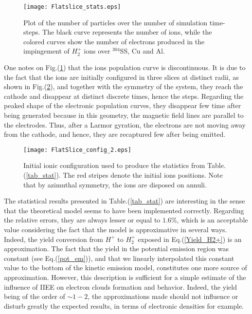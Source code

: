 \begin{figure}[h!]
\centering
	\texttt{[image: Flatslice\_stats.eps]}
	\caption{\label{flat_slice} Plot of the number of particles over the number of simulation time-steps. The black curve represents the number of ions, while the colored curves show the number of electrons produced in the impingement of $H_2^+$ ions over $^{304}$SS, Cu and Al.}
\end{figure}  

\noindent One notes on Fig.(\ref{flat_slice}) that the ions population curve is discontinuous. It is due to the fact that the ions are initially configured in three slices at distinct radii, as shown in Fig.(\ref{slice_config}), and together with the symmetry of the system, they reach the cathode and disappear at distinct discrete times, hence the steps. Regarding the peaked shape of the electronic population curves, they disappear few time after being generated because in this geometry, the magnetic field lines are parallel to the electrodes. Thus, after a Larmor gyration, the electrons are not moving away from the cathode, and hence, they are recaptured few after being emitted.\\

\begin{figure}[h!]
\centering
	\texttt{[image: FlatSlice\_config\_2.eps]}
	\caption{\label{slice_config}  Initial ionic configuration used to produce the statistics from Table.(\ref{tab_stat}). The red stripes denote the initial ions positions. Note that by azimuthal symmetry, the ions are disposed on annuli. }
\end{figure}  

The statistical results presented in Table.(\ref{tab_stat}) are interesting in the sense that the theoretical model seems to have been implemented correctly. Regarding the relative errors, they are always lesser or equal to $1.6\%$, which is an acceptable value considering the fact that the model is approximative in several ways. Indeed, the yield conversion from $H^+$ to $H_2^{+}$ exposed in Eq.(\ref{Yield_H2+}) is an approximation. The fact that the yield in the potential emission region was constant (see Eq.(\ref{pot_em})), and that we linearly interpolated this constant value to the bottom of the kinetic emission model, constitutes one more source of approximation. However, this description is sufficient for a simple estimate of the influence of IIEE on electron clouds formation and behavior. Indeed, the yield being of the order of $\sim 1-2$, the approximations made should not influence or disturb greatly the expected results, in terms of electronic densities for example. \\

